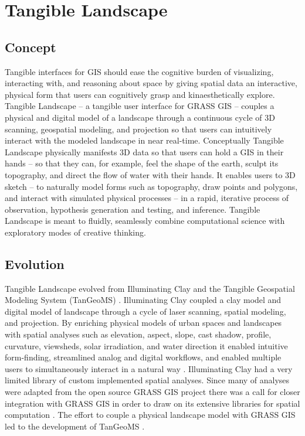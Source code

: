 \documentclass[prodmode,acmtochi]{acmsmall} %
\begin{document}
\section{Tangible Landscape}

\subsection{Concept}
%
Tangible interfaces for GIS 
should ease the cognitive burden of 
visualizing, interacting with, 
and reasoning about space
by giving spatial data an interactive, physical form 
that users can cognitively grasp and kinaesthetically explore. 
%
Tangible Landscape -- a tangible user interface for GRASS GIS --
couples a physical and digital model of a landscape through a continuous cycle of 3D scanning, geospatial modeling, and projection
so that users can intuitively interact with the modeled landscape in near real-time.
%
Conceptually Tangible Landscape physically manifests 3D data 
so that users can hold a GIS in their hands -- 
so that they can, for example, feel the shape of the earth, sculpt its topography, and direct the flow of water with their hands.
%
It enables users to 3D sketch -- 
to naturally model forms such as topography, 
draw points and polygons, 
and interact with simulated physical processes -- 
in a rapid, iterative process 
of observation, hypothesis generation and testing, and inference. 
%
Tangible Landscape is meant to fluidly, seamlessly combine
computational science with exploratory modes of creative thinking.

\subsection{Evolution}
Tangible Landscape evolved from 
Illuminating Clay \cite{Piper2002a} and 
the Tangible Geospatial Modeling System (TanGeoMS) \cite{Tateosian2010}. 
Illuminating Clay coupled a clay model and digital model of landscape 
through a cycle of laser scanning, spatial modeling, and projection.
By enriching physical models of urban spaces and landscapes 
with spatial analyses  
such as 
elevation, aspect, slope, cast shadow, profile, curvature, 
viewsheds, solar irradiation, and water direction
it enabled
intuitive form-finding, 
streamlined analog and digital workflows, 
and enabled multiple users to simultaneously interact in a natural way \cite{Ratti2004}. 
Illuminating Clay had a very limited library of custom implemented spatial analyses. 
Since many of analyses were adapted 
from the open source GRASS GIS project \cite{Piper2002a} 
there was a call for closer integration with GRASS GIS 
in order to draw on its extensive libraries 
for spatial computation \cite{Piper2002b}. 
The effort to couple a physical landscape model with GRASS GIS \cite{Mitasova2006} 
led to the development of 
TanGeoMS \cite{Tateosian2010}.
\end{document}
